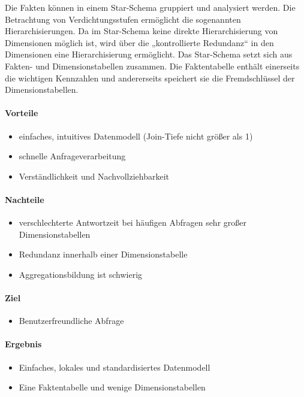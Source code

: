 Die Fakten können in einem Star-Schema gruppiert und analysiert werden. Die Betrachtung von Verdichtungsstufen ermöglicht die sogenannten Hierarchisierungen. Da im Star-Schema keine direkte Hierarchisierung von Dimensionen möglich ist, wird über die „kontrollierte Redundanz“ in den Dimensionen eine Hierarchisierung ermöglicht.
Das Star-Schema setzt sich aus Fakten- und Dimensionstabellen zusammen. Die Faktentabelle enthält einerseits die wichtigen Kennzahlen und andererseits speichert sie die Fremdschlüssel der Dimensionstabellen.

\paragraph{Vorteile}
\begin{itemize}
    \item einfaches, intuitives Datenmodell (Join-Tiefe nicht größer als 1)
    \item schnelle Anfrageverarbeitung
    \item Verständlichkeit und Nachvollziehbarkeit
\end{itemize}

\paragraph{Nachteile}
\begin{itemize}
    \item verschlechterte Antwortzeit bei häufigen Abfragen sehr großer Dimensionstabellen 
    \item Redundanz innerhalb einer Dimensionstabelle
    \item Aggregationsbildung ist schwierig
    
\end{itemize}

\paragraph{Ziel}
\begin{itemize}
    \item Benutzerfreundliche Abfrage 
\end{itemize}

\paragraph{Ergebnis}
\begin{itemize}
    \item Einfaches, lokales und standardisiertes Datenmodell
    \item Eine Faktentabelle und wenige Dimensionstabellen    
\end{itemize}

